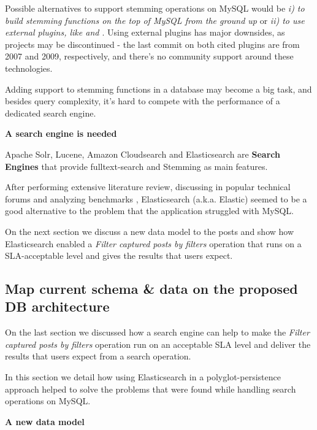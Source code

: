 Possible alternatives to support stemming operations on MySQL would be \textit{i) to build stemming functions on the top of MySQL from the ground up} or \textit{ii) to use external plugins, like \cite{udmstemmer} and \cite{udfstemmer}}. Using external plugins has major downsides, as projects may be discontinued - the last commit on both cited plugins are from 2007 and 2009, respectively, and there's no community support around these technologies. 

Adding support to stemming functions in a database may become a big task, and besides query complexity, it's hard to compete with the performance of a dedicated search engine.   

\textbf{A search engine is needed}

Apache Solr, Lucene, Amazon Cloudsearch and Elasticsearch are \textbf{Search Engines} that provide fulltext-search and Stemming as main features.

After performing extensive literature review, discussing in popular technical forums and analyzing benchmarks \cite{StackOverflowElastic} \cite{SolrVsES} \cite{quoraES}, Elasticsearch (a.k.a. Elastic) seemed to be a good alternative to the problem that the application struggled with MySQL.

On the next section we discuss a new data model to the posts and show how Elasticsearch enabled a \textit{Filter captured posts by filters} operation that runs on a SLA-acceptable level and gives the results that users expect. 

 










\clearpage
\subsection{Map current schema \& data on the proposed DB architecture}

On the last section we discussed how a search engine can help to make the \textit{Filter captured posts by filters} operation run on an acceptable SLA level and deliver the results that users expect from a search operation. 

In this section we detail how using Elasticsearch in a polyglot-persistence approach helped to solve the problems that were found while handling search operations on MySQL.

\textbf{A new data model}

